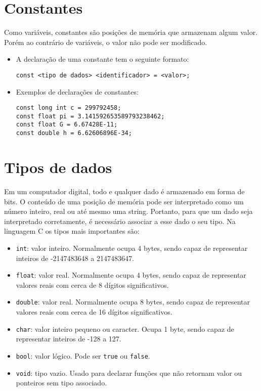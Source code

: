 \documentclass{book}
\begin{document}

\section{Constantes}

Como variáveis, constantes são posições de memória que armazenam algum valor. Porém ao contrário de variáveis, o valor não pode ser modificado.

\begin{itemize}

\item A declaração de uma constante tem o seguinte formato:

{\tt const <tipo de dados> <identificador> = <valor>;}

\item Exemplos de declarações de constantes:
\begin{lstlisting}
const long int c = 299792458;
const float pi = 3.141592653589793238462;
const float G = 6.67428E-11;
const double h = 6.62606896E-34;
\end{lstlisting}

\end{itemize}



\section{Tipos de dados}

Em um computador digital, todo e qualquer dado é armazenado em forma de bits. O conteúdo de uma posição de memória pode ser interpretado como um número inteiro, real ou até mesmo uma string. Portanto, para que um dado seja interpretado corretamente, é necessário associar a esse dado o seu tipo. Na linguagem C os tipos mais importantes são:

\begin{itemize}
\item {\tt int}: valor inteiro. Normalmente ocupa 4 bytes, sendo capaz de representar inteiros de -2147483648 a 2147483647.
\item {\tt float}: valor real. Normalmente ocupa 4 bytes, sendo capaz de representar valores reais com cerca de 8 dígitos significativos.
\item {\tt double}: valor real. Normalmente ocupa 8 bytes, sendo capaz de representar valores reais com cerca de 16 dígitos significativos.
\item {\tt char}: valor inteiro pequeno ou caracter. Ocupa 1 byte, sendo capaz de representar inteiros de -128 a 127.
\item {\tt bool}: valor lógico. Pode ser {\tt true} ou {\tt false}.

\item {\tt void}: tipo vazio. Usado para declarar funções que não retornam valor ou ponteiros sem tipo associado.
\end{itemize}
\end{document}
